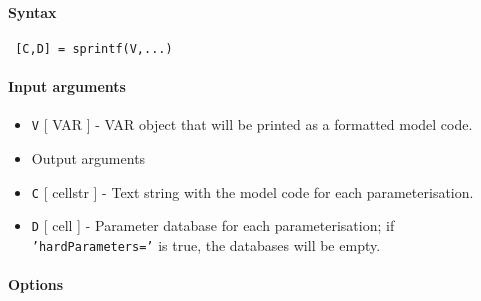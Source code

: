 


	\paragraph{Syntax}
 
 \begin{verbatim}
 [C,D] = sprintf(V,...)
 \end{verbatim}
 
 \paragraph{Input arguments}
 
 \begin{itemize}
 \item
   \texttt{V} {[} VAR {]} - VAR object that will be printed as a
   formatted model code.
 \item
   Output arguments
 \item
   \texttt{C} {[} cellstr {]} - Text string with the model code for each
   parameterisation.
 \item
   \texttt{D} {[} cell {]} - Parameter database for each
   parameterisation; if \texttt{'hardParameters='} is true, the databases
   will be empty.
 \end{itemize}
 
 \paragraph{Options}
 
